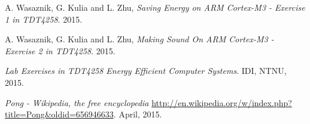 \begin{thebibliography}{9}

  A. Wasaznik,
  G. Kulia and
  L. Zhu,
  \emph{Saving Energy on ARM Cortex-M3 - Exercise 1 in TDT4258}.
  2015.

  A. Wasaznik,
  G. Kulia and
  L. Zhu,
  \emph{Making Sound On ARM Cortex-M3 - Exercise 2 in TDT4258}.
  2015.

  \emph{Lab Exercises in TDT4258 Energy Efficient Computer Systems}.
  IDI, NTNU,
  2015.

  \emph{Pong - Wikipedia, the free encyclopedia}
  \url{http://en.wikipedia.org/w/index.php?title=Pong&oldid=656946633}.
  April, 2015.

\end{thebibliography}
